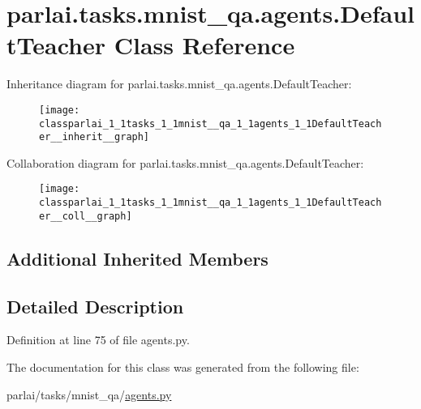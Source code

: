 \hypertarget{classparlai_1_1tasks_1_1mnist__qa_1_1agents_1_1DefaultTeacher}{}\section{parlai.\+tasks.\+mnist\+\_\+qa.\+agents.\+Default\+Teacher Class Reference}
\label{classparlai_1_1tasks_1_1mnist__qa_1_1agents_1_1DefaultTeacher}


Inheritance diagram for parlai.\+tasks.\+mnist\+\_\+qa.\+agents.\+Default\+Teacher\+:
\nopagebreak
\begin{figure}[H]
\begin{center}
\leavevmode
\texttt{[image: classparlai\_1\_1tasks\_1\_1mnist\_\_qa\_1\_1agents\_1\_1DefaultTeacher\_\_inherit\_\_graph]}
\end{center}
\end{figure}


Collaboration diagram for parlai.\+tasks.\+mnist\+\_\+qa.\+agents.\+Default\+Teacher\+:
\nopagebreak
\begin{figure}[H]
\begin{center}
\leavevmode
\texttt{[image: classparlai\_1\_1tasks\_1\_1mnist\_\_qa\_1\_1agents\_1\_1DefaultTeacher\_\_coll\_\_graph]}
\end{center}
\end{figure}
\subsection*{Additional Inherited Members}


\subsection{Detailed Description}


Definition at line 75 of file agents.\+py.



The documentation for this class was generated from the following file\+:\begin{DoxyCompactItemize}
\item 
parlai/tasks/mnist\+\_\+qa/\hyperlink{parlai_2tasks_2mnist__qa_2agents_8py}{agents.\+py}\end{DoxyCompactItemize}
